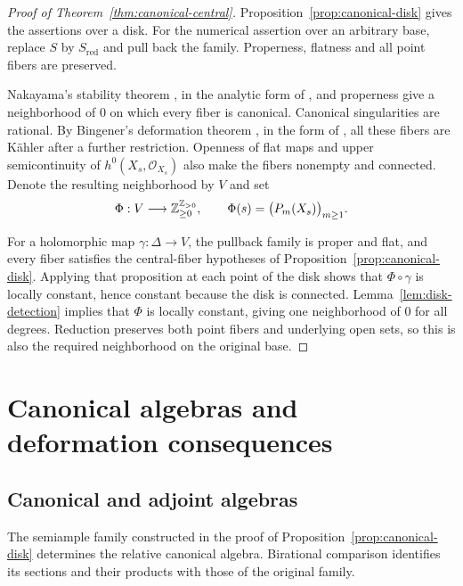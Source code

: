 \documentclass[11pt,a4paper]{article}
\numberwithin{equation}{section}
\theoremstyle{definition}
\theoremstyle{remark}
\newcommand{\OO}{\mathcal O}\newcommand{\cX}{\mathcal X}
\begin{document}
\begin{proof}[Proof of Theorem~\ref{thm:canonical-central}]
Proposition~\ref{prop:canonical-disk} gives the assertions over a disk.
For the numerical assertion over an arbitrary base, replace $S$
by $S_{\mathrm{red}}$ and pull back the family. Properness,
flatness and all point fibers are preserved.

Nakayama's stability theorem \cite[VI.5.2]{Nakayama2004}, in the
analytic form of \cite[Lemma~10]{Kollar2021}, and properness give
a neighborhood of $0$ on which every fiber is canonical.
Canonical singularities are rational. By Bingener's deformation
theorem \cite[Theorem~6.3]{Bingener1983}, in the form of
\cite[Corollary~3.3.6]{Kirschner2012}, all these fibers are
Kähler after a further restriction. Openness of flat maps and upper
semicontinuity of $h^0(X_s,\OO_{X_s})$ also make the fibers nonempty
and connected. Denote the resulting neighborhood by $V$ and set
\[
 \Phi:V\longrightarrow\mathbb Z_{\ge0}^{\mathbb Z_{>0}},\qquad
 \Phi(s)=\bigl(P_m(X_s)\bigr)_{m\ge1}.
\]

For a holomorphic map $\gamma:\Delta\to V$, the pullback family
is proper and flat, and every fiber satisfies the central-fiber
hypotheses of Proposition~\ref{prop:canonical-disk}. Applying that
proposition at each point of the disk shows that $\Phi\circ\gamma$
is locally constant, hence constant because the disk is connected.
Lemma~\ref{lem:disk-detection} implies
that $\Phi$ is locally constant, giving one neighborhood of $0$ for all
degrees. Reduction preserves both point fibers and underlying open
sets, so this is also the required neighborhood on the original base.
\end{proof}

\section{Canonical algebras and deformation consequences}
\label{sec:consequences}

\subsection{Canonical and adjoint algebras}

The semiample family constructed in the proof of
Proposition~\ref{prop:canonical-disk} determines the relative canonical
algebra. Birational comparison identifies its sections and their
products with those of the original family.
\end{document}
